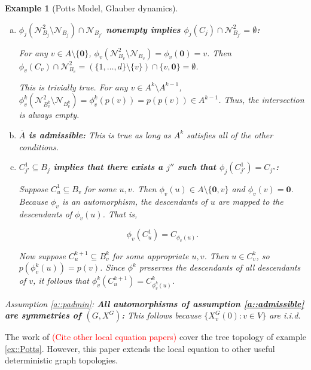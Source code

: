 \documentclass[12pt]{article}
\newcommand{\mc}{\mathcal}
\newcommand{\ov}{\overline}
\newcommand{\tr}{\textcolor{red}}
\newcommand{\ind}{\hspace{24pt}}
\newcommand{\neigh}[1]{\mc{N}_{#1}}				%
\newcommand{\dneigh}[1]{\mc{N}^2_{#1}}			%
\renewcommand{\root}{\mathbf{0}}					%
\newcommand{\indx}[1]{^{#1}}						%
\newcommand{\Xf}{X}									%
\newcommand{\vind}[1]{_{#1}}						%
\newcommand{\tme}[1]{(#1)}							%
\newcommand{\gind}[1]{^{#1}}						%
\newtheorem{example}[thms]{Example}
\begin{document}
\begin{example}[Potts Model, Glauber dynamics]
\begin{description}
\begin{enumerate}[(a)]
Finally,

\[C\indx{k}_u\cap(\phi\indx{k})^{-1}_u(\neigh{B_u}) = C\indx{k}_u\cap u' = u' = \neigh{B\indx{k+1}_{u'}}.\]

\item {\bfseries\boldmath \(\phi_j(\dneigh{B_j}\setminus \neigh{B_j})\cap \neigh{B_{j'}}\) nonempty implies \(\phi_j(C_j)\cap\dneigh{B_{j'}} = \emptyset\):}

For any \(v \in A\setminus\{\root\}\), \(\phi_v(\dneigh{B_v}\setminus\neigh{B_v}) = \phi_v(\root) = v\). Then \(\phi_v(C_v)\cap\dneigh{B_v} = (\{1,\dots,d\}\setminus\{v\})\cap \{v,\root\} = \emptyset\).

\ind This is trivially true. For any \(v \in A\indx{k}\setminus A\indx{k-1}\), \(\phi\indx{k}_v(\dneigh{B\indx{k}_v}\setminus\neigh{B\indx{k}_v}) = \phi\indx{k}_v(p(v)) = p(p(v)) \in A\indx{k-1}\). Thus, the intersection is always empty.

\item {\bfseries\boldmath \(\ov{A}\) is admissible:} This is true as long as \(A\indx{k}\) satisfies all of the other conditions.

\item {\bfseries\boldmath \(C\indx{1}_{j'} \subseteq B_j\) implies that there exists a \(j''\) such that \(\phi_j(C\indx{1}_{j'}) = C_{j''}\):} 

Suppose \(C\indx{1}_u \subseteq B_v\) for some \(u,v\). Then \(\phi_v(u) \in A\setminus\{\root,v\}\) and \(\phi_v(v) = \root\). Because \(\phi_v\) is an automorphism, the descendants of \(u\) are mapped to the descendants of \(\phi_v(u)\). That is,

\[\phi_v(C\indx{1}_u) = C_{\phi_v(u)}.\]

Now suppose \(C\indx{k+1}_u \subseteq B\indx{k}_v\) for some appropriate \(u,v\). Then \(u \in C\indx{k}_v\), so \(p(\phi\indx{k}_v(u)) = p(v)\). Since \(\phi\indx{k}\) preserves the descendants of all descendants of \(v\), it follows that \(\phi\indx{k}_v(C\indx{k+1}_u) = C\indx{k}_{\phi\indx{k}_v(u)}\).
\end{enumerate}

\item[] Assumption \ref{a::padmin}: \textbf{All automorphisms of assumption \ref{a::admissible} are symmetries of \((G,\Xf\gind{G})\):} This follows because \(\{\Xf\gind{G}\vind{v}\tme{0}:v \in V\}\) are i.i.d.
\end{description}
\end{example}

The work of \tr{(Cite other local equation papers)} cover the tree topology of example \ref{ex::Potts}. However, this paper extends the local equation to other useful deterministic graph topologies.
\end{document}
